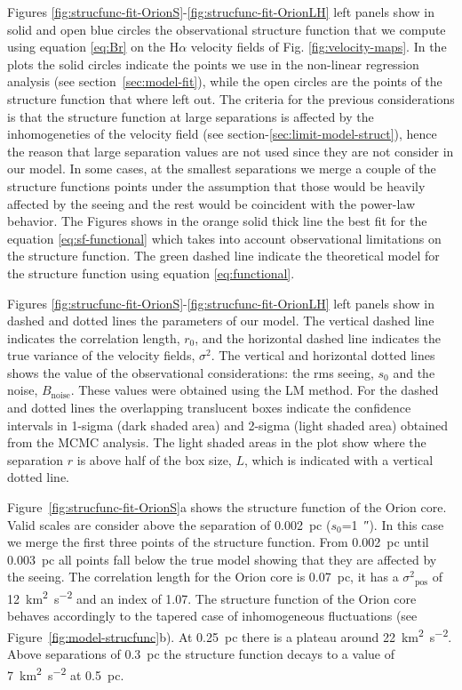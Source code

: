\documentclass[fleqn,usenatbib, useAMS, a4paper]{mnras}
\newcommand\pos{\ensuremath{_{\mathrm{pos}}}}
\newcommand\ha{\ensuremath{\text{H}\alpha}}
\begin{document}
Figures \ref{fig:strucfunc-fit-OrionS}-\ref{fig:strucfunc-fit-OrionLH} left panels show in solid and open blue circles the observational structure function that we compute using equation \ref{eq:Br} on the \ha{} velocity fields of Fig. \ref{fig:velocity-maps}. 
In the plots the solid circles indicate the points we use in the non-linear regression analysis (see section~\ref{sec:model-fit}), while the open circles are the points of the structure function that where left out.
The criteria for the previous considerations is that the structure function at large separations is affected by the inhomogeneties of the velocity field (see section-\ref{sec:limit-model-struct}), hence the reason that large separation values are not used since they are not consider in our model. 
In some cases, at the smallest separations we merge a couple of the structure functions points under the assumption that those would be heavily affected by the seeing and the rest would be coincident with the power-law behavior.
The Figures shows in the orange solid thick line the best fit for the equation \ref{eq:sf-functional} which takes into account observational limitations on the structure function.
The green dashed line indicate the theoretical model for the structure function using equation \ref{eq:functional}.

Figures \ref{fig:strucfunc-fit-OrionS}-\ref{fig:strucfunc-fit-OrionLH} left panels show in dashed and dotted lines the parameters of our model.
The vertical dashed line indicates the correlation length, \(r_0\), and the horizontal dashed line indicates the true variance of the velocity fields, \(\sigma^2\).
The vertical and horizontal dotted lines shows the value of the observational considerations: the rms seeing, \(s_0\) and the noise, \(B_{\text{noise}}\).
These values were obtained using the LM method.
For the dashed and dotted lines the overlapping translucent boxes indicate the confidence intervals in 1-sigma (dark shaded area) and 2-sigma (light shaded area) obtained from the MCMC analysis.
The light shaded areas in the plot show where the separation \(r\) is above half of the box size, \(L\), which is indicated with a vertical dotted line.

Figure~\ref{fig:strucfunc-fit-OrionS}a shows the structure function of the Orion core.
Valid scales are consider above the separation of \SI{0.002}{pc} (\(s_0\)=\SI{1}{\arcsecond}).
In this case we merge the first three points of the structure function.
From \SI{0.002}{pc} until \SI{0.003}{pc} all points fall below the true model showing that they are affected by the seeing. 
The correlation length for the Orion core is \SI{0.07}{pc}, it has a \(\sigma^2\pos\) of \SI{12}{km^{2}.s^{-2}} and an index of \num{1.07}.
The structure function of the Orion core behaves accordingly to the tapered case of inhomogeneous fluctuations (see Figure~\ref{fig:model-strucfunc}b).
At \SI{0.25}{pc} there is a plateau around \SI{22}{km^{2}.s^{-2}}.
Above separations of \SI{0.3}{pc} the structure function decays to a value of \SI{7}{km^{2}.s^{-2}} at  \SI{0.5}{pc}.
\end{document}
